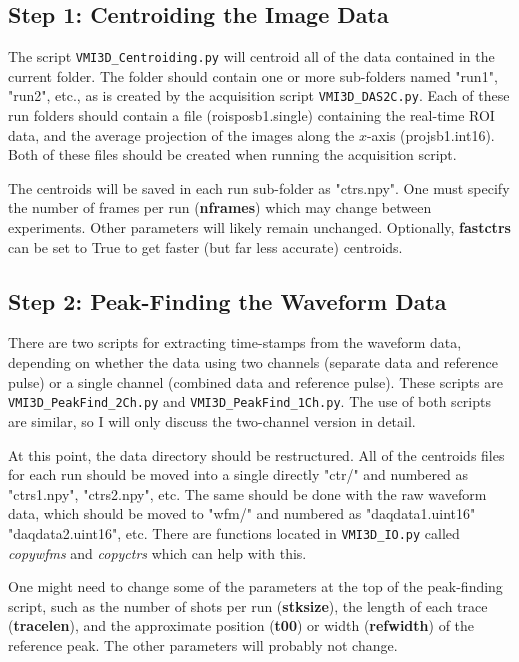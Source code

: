 \documentclass[12pt]{article}
\begin{document}
\subsection{Step 1: Centroiding the Image Data}

The script \texttt{VMI3D\_Centroiding.py} will centroid all of the data contained in the current folder.
The folder should contain one or more sub-folders named "run1", "run2", etc., as is created by the acquisition script \texttt{VMI3D\_DAS2C.py}.
Each of these run folders should contain a file (roisposb1.single) containing the real-time ROI data, and the average projection of the images along the $x$-axis (projsb1.int16).
Both of these files should be created when running the acquisition script.

The centroids will be saved in each run sub-folder as "ctrs.npy".
One must specify the number of frames per run (\textbf{nframes}) which may change between experiments.
Other parameters will likely remain unchanged.
Optionally, \textbf{fastctrs} can be set to True to get faster (but far less accurate) centroids.

\subsection{Step 2: Peak-Finding the Waveform Data}

There are two scripts for extracting time-stamps from the waveform data, depending on whether the data using two channels (separate data and reference pulse) or a single channel (combined data and reference pulse).
These scripts are \texttt{VMI3D\_PeakFind\_2Ch.py} and \texttt{VMI3D\_PeakFind\_1Ch.py}.
The use of both scripts are similar, so I will only discuss the two-channel version in detail.

At this point, the data directory should be restructured.
All of the centroids files for each run should be moved into a single directly "ctr/" and numbered as "ctrs1.npy", "ctrs2.npy", etc.
The same should be done with the raw waveform data, which should be moved to "wfm/" and numbered as "daqdata1.uint16" "daqdata2.uint16", etc.
There are functions located in \texttt{VMI3D\_IO.py} called \textit{copywfms} and \textit{copyctrs} which can help with this.

One might need to change some of the parameters at the top of the peak-finding script, such as the number of shots per run (\textbf{stksize}), the length of each trace (\textbf{tracelen}), and the approximate position (\textbf{t00}) or width (\textbf{refwidth}) of the reference peak.
The other parameters will probably not change.
\end{document}
